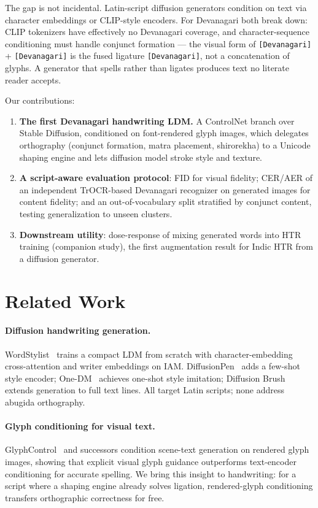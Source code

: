 \documentclass{llncs}
\newcommand{\dn}[1]{\texttt{[Devanagari]}}
\newcommand{\dn}[1]{{\devafont #1}}
\begin{document}
The gap is not incidental. Latin-script diffusion generators condition on
text via character embeddings or CLIP-style encoders. For Devanagari both
break down: CLIP tokenizers have effectively no Devanagari coverage, and
character-sequence conditioning must handle conjunct formation — the visual
form of \dn{क्} + \dn{ष} is the fused ligature \dn{क्ष}, not a
concatenation of glyphs. A generator that spells rather than ligates
produces text no literate reader accepts.

Our contributions:
\begin{enumerate}
  \item \textbf{The first Devanagari handwriting LDM.} A ControlNet branch
  over Stable Diffusion, conditioned on font-rendered glyph images, which
  delegates orthography (conjunct formation, matra placement, shirorekha)
  to a Unicode shaping engine and lets diffusion model stroke style and
  texture.
  \item \textbf{A script-aware evaluation protocol}: FID for visual
  fidelity; CER/AER of an independent TrOCR-based Devanagari recognizer on
  generated images for content fidelity; and an out-of-vocabulary split
  stratified by conjunct content, testing generalization to unseen
  clusters.
  \item \textbf{Downstream utility}: dose-response of mixing generated
  words into HTR training (companion study), the first augmentation result
  for Indic HTR from a diffusion generator.
\end{enumerate}

\section{Related Work}

\paragraph{Diffusion handwriting generation.}
WordStylist~\cite{nikolaidou2023wordstylist} trains a compact LDM from
scratch with character-embedding cross-attention and writer embeddings on
IAM. DiffusionPen~\cite{nikolaidou2024diffusionpen} adds a few-shot style
encoder; One-DM~\cite{dai2024onedm} achieves one-shot style imitation;
Diffusion Brush extends generation to full text lines. All target Latin
scripts; none address abugida orthography.

\paragraph{Glyph conditioning for visual text.}
GlyphControl~\cite{yang2023glyphcontrol} and successors condition scene-text
generation on rendered glyph images, showing that explicit visual glyph
guidance outperforms text-encoder conditioning for accurate spelling. We
bring this insight to handwriting: for a script where a shaping engine
already solves ligation, rendered-glyph conditioning transfers orthographic
correctness for free.
\end{document}
